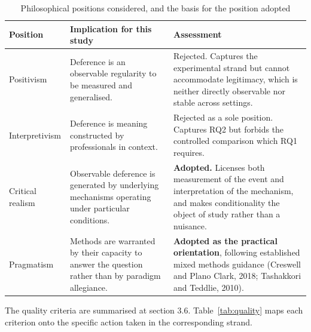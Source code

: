 \documentclass[12pt,a4paper]{article}
\begin{document}
\begin{table}[H]
\centering\footnotesize
\caption{Philosophical positions considered, and the basis for the position adopted}
\label{tab:phil}
\begin{tabularx}{\textwidth}{@{}p{2.6cm} X p{4.6cm}@{}}
\toprule
\textbf{Position} & \textbf{Implication for this study} & \textbf{Assessment} \\
\midrule
Positivism & Deference is an observable regularity to be measured and generalised. & Rejected. Captures
the experimental strand but cannot accommodate legitimacy, which is neither directly observable nor stable
across settings. \\
Interpretivism & Deference is meaning constructed by professionals in context. & Rejected as a sole
position. Captures RQ2 but forbids the controlled comparison which RQ1 requires. \\
Critical realism & Observable deference is generated by underlying mechanisms operating under particular
conditions. & \textbf{Adopted.} Licenses both measurement of the event and interpretation of the mechanism,
and makes conditionality the object of study rather than a nuisance. \\
Pragmatism & Methods are warranted by their capacity to answer the question rather than by paradigm
allegiance. & \textbf{Adopted as the practical orientation}, following established mixed methods guidance
(Creswell and Plano Clark, 2018; Tashakkori and Teddlie, 2010). \\
\bottomrule
\end{tabularx}
\end{table}

\newpage
{}

The quality criteria are summarised at section 3.6. Table~\ref{tab:quality} maps each criterion onto
the specific action taken in the corresponding strand.
\end{document}
